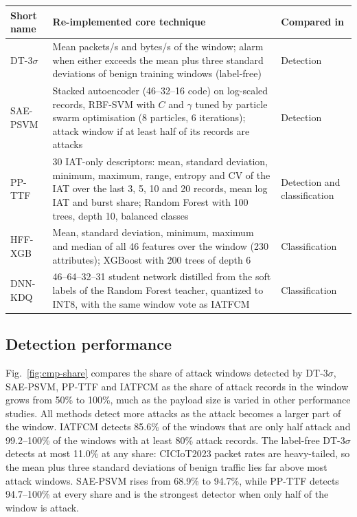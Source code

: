 \documentclass[]{interact}
\theoremstyle{plain}
\theoremstyle{definition}
\begin{document}
\begin{table}[htbp]
{\small
\begin{tabular}{p{1.7cm}p{8.9cm}p{2.1cm}}
\toprule
Short name & Re-implemented core technique & Compared in \\
\midrule
DT-3$\sigma$\cite{dynamic_ids2025} & Mean packets/s and bytes/s of the window; alarm when either exceeds the mean plus three standard deviations of benign training windows (label-free) & Detection \\
SAE-PSVM\cite{nie2025intrusion} & Stacked autoencoder (46--32--16 code) on log-scaled records, RBF-SVM with $C$ and $\gamma$ tuned by particle swarm optimisation (8 particles, 6 iterations); attack window if at least half of its records are attacks & Detection \\
PP-TTF\cite{ertam2026privacy} & 30 IAT-only descriptors: mean, standard deviation, minimum, maximum, range, entropy and CV of the IAT over the last 3, 5, 10 and 20 records, mean log IAT and burst share; Random Forest with 100 trees, depth 10, balanced classes & Detection and classification \\
HFF-XGB\cite{solpan2026hybrid} & Mean, standard deviation, minimum, maximum and median of all 46 features over the window (230 attributes); XGBoost with 200 trees of depth 6 & Classification \\
DNN-KDQ\cite{umar2025energy} & 46--64--32--31 student network distilled from the soft labels of the Random Forest teacher, quantized to INT8, with the same window vote as IATFCM & Classification \\
\bottomrule
\end{tabular}}
\label{tab:compared}
\end{table}

\subsection{Detection performance}
Fig.~\ref{fig:cmp-share} compares the share of attack windows detected by DT-3$\sigma$, SAE-PSVM, PP-TTF and IATFCM as the share of attack records in the window grows from 50\% to 100\%, much as the payload size is varied in other performance studies. All methods detect more attacks as the attack becomes a larger part of the window. IATFCM detects 85.6\% of the windows that are only half attack and 99.2--100\% of the windows with at least 80\% attack records. The label-free DT-3$\sigma$ detects at most 11.0\% at any share: CICIoT2023 packet rates are heavy-tailed, so the mean plus three standard deviations of benign traffic lies far above most attack windows. SAE-PSVM rises from 68.9\% to 94.7\%, while PP-TTF detects 94.7--100\% at every share and is the strongest detector when only half of the window is attack.
\end{document}
